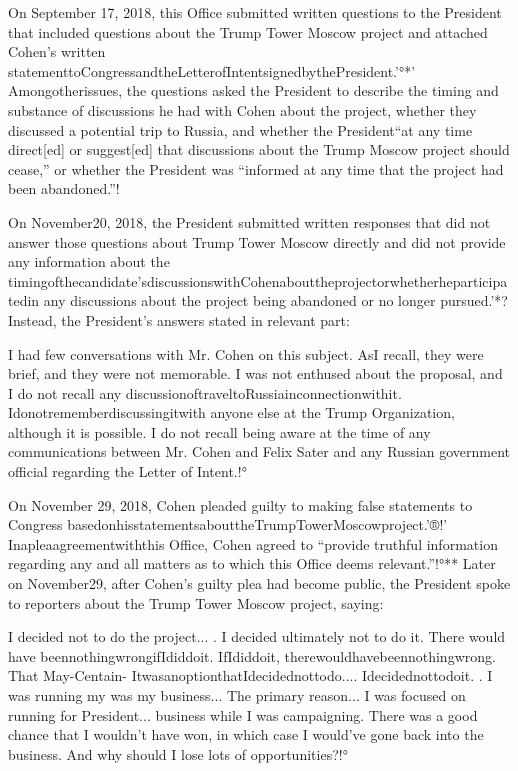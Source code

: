 On September 17, 2018, this Office submitted written questions to the President that included questions about the Trump Tower Moscow project and attached Cohen's written statementtoCongressandtheLetterofIntentsignedbythePresident.'°*'
Amongotherissues, the questions asked the President to describe the timing and substance of discussions he had with Cohen about the project, whether they discussed a potential trip to Russia, and whether the President“at any time direct[ed] or suggest[ed] that discussions about the Trump Moscow project should cease,” or whether the President was “informed at any time that the project had been abandoned.”!%

On November20, 2018, the President submitted written responses that did not answer those questions about Trump Tower Moscow directly and did not provide any information about the timingofthecandidate'sdiscussionswithCohenabouttheprojectorwhetherheparticipatedin any discussions about the project being abandoned or no longer pursued.'*?
Instead, the President's answers stated in relevant part:

I had few conversations with Mr. Cohen on this subject.
AsI recall, they were brief, and they were not memorable.
I was not enthused about the proposal, and I do not recall any discussionoftraveltoRussiainconnectionwithit.
Idonotrememberdiscussingitwith anyone else at the Trump Organization, although it is possible.
I do not recall being aware at the time of any communications between Mr. Cohen and Felix Sater and any Russian government official regarding the Letter of Intent.!°

On November 29, 2018, Cohen pleaded guilty to making false statements to Congress basedonhisstatementsabouttheTrumpTowerMoscowproject.'®!'
Inapleaagreementwiththis Office, Cohen agreed to “provide truthful information regarding any and all matters as to which this Office deems relevant.”!°**
Later on November29, after Cohen's guilty plea had become public, the President spoke to reporters about the Trump Tower Moscow project, saying:

I decided not to do the project... .
I decided ultimately not to do it.
There would have beennothingwrongifIdiddoit.
IfIdiddoit, therewouldhavebeennothingwrong.
That
May-Centain-
ItwasanoptionthatIdecidednottodo....
Idecidednottodoit. .
I was running my
was my business...
The primary reason...
I was focused on running for President...
business while I was campaigning.
There was a good chance that I wouldn't have won, in which case I would've gone back into the business.
And why should I lose lots of opportunities?!°

